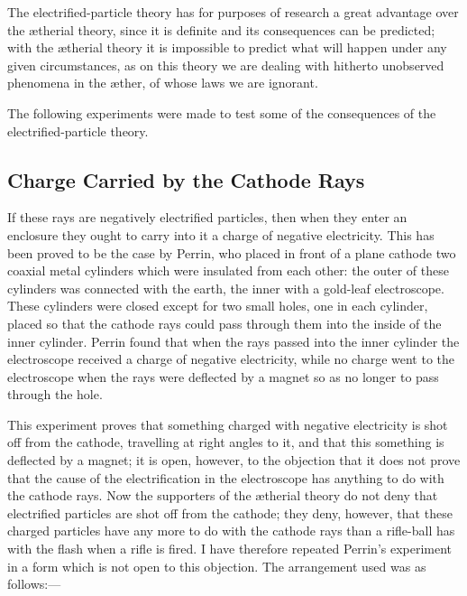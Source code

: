 The electrified-particle theory has for purposes of research a great
advantage over the ætherial theory, since it is definite and its
consequences can be predicted; with the ætherial theory it is impossible
to predict what will happen under any given cir\-cum\-stan\-ces, as on this
theory we are dealing with hitherto unobserved phenomena in the æther,
of whose laws we are ignorant.

The following experiments were made to test some of the consequences of
the electrified-particle theory.

\subsection*{Charge Carried by the Cathode Rays}

If these rays are negatively electrified particles, then when they enter
an enclosure they ought to carry into it a charge of negative
electricity. This has been proved to be the case by Perrin, who placed
in front of a plane cathode two coaxial metal cylinders which were
insulated from each other: the outer of these cylinders was connected
with the earth, the inner with a gold-leaf electroscope. These cylinders
were closed except for two small holes, one in each cylinder, placed so
that the cathode rays could pass through them into the inside of the
inner cylinder. Perrin found that when the rays passed into the inner
cylinder the electroscope received a charge of negative electricity,
while no charge went to the electroscope when the rays were deflected by
a magnet so as no longer to pass through the hole.

This experiment proves that something charged with negative electricity
is shot off from the cathode, travelling at right angles to it, and that
this something is deflected by a magnet; it is open, however, to the
objection that it does not prove that the cause of the electrification
in the electroscope has anything to do with the cathode rays. Now the
supporters of the ætherial theory do not deny that electrified particles
are shot off from the cathode; they deny, however, that these charged
particles have any more to do with the cathode rays than a rifle-ball
has with the flash when a rifle is fired. I have therefore repeated
Perrin's experiment in a form which is not open to this objection. The
arrangement used was as follows:---

